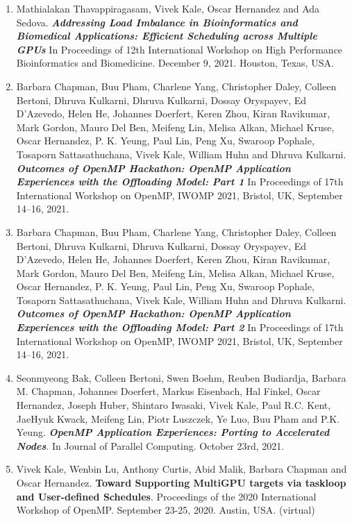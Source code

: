 \begin{enumerate}
\item Mathialakan Thavappiragasam, Vivek Kale, Oscar Hernandez and  Ada Sedova. \textbf{\textit{Addressing Load Imbalance in Bioinformatics and Biomedical Applications: Efficient Scheduling across Multiple GPUs}} In Proceedings of 12th International Workshop on High Performance Bioinformatics and Biomedicine. December 9, 2021. Houston, Texas, USA. 

\item Barbara Chapman, Buu Pham, Charlene Yang, Christopher Daley, Colleen Bertoni, Dhruva Kulkarni, Dhruva Kulkarni, Dossay Oryspayev, Ed D’Azevedo, Helen He, Johannes Doerfert, Keren Zhou, Kiran Ravikumar, Mark Gordon, Mauro Del Ben, Meifeng Lin, Melisa Alkan, Michael Kruse, Oscar Hernandez, P. K. Yeung, Paul Lin, Peng Xu, Swaroop Pophale, Tosaporn Sattasathuchana, Vivek Kale, William Huhn and Dhruva Kulkarni. \textbf{\textit{Outcomes of OpenMP Hackathon: OpenMP Application Experiences with the Offloading Model: Part 1}} In Proceedings of 17th International Workshop on OpenMP, IWOMP 2021, Bristol, UK, September 14–16, 2021. 

\item Barbara Chapman, Buu Pham, Charlene Yang, Christopher Daley, Colleen Bertoni, Dhruva Kulkarni, Dhruva Kulkarni, Dossay Oryspayev, Ed D’Azevedo, Helen He, Johannes Doerfert, Keren Zhou, Kiran Ravikumar, Mark Gordon, Mauro Del Ben, Meifeng Lin, Melisa Alkan, Michael Kruse, Oscar Hernandez, P. K. Yeung, Paul Lin, Peng Xu, Swaroop Pophale, Tosaporn Sattasathuchana, Vivek Kale, William Huhn and Dhruva Kulkarni. \textbf{\textit{Outcomes of OpenMP Hackathon: OpenMP Application Experiences with the Offloading Model: Part 2}} In Proceedings of 17th International Workshop on OpenMP, IWOMP 2021, Bristol, UK, September 14–16, 2021. 

\item Seonmyeong Bak, Colleen Bertoni, Swen Boehm, Reuben Budiardja, Barbara M. Chapman, Johannes Doerfert, Markus Eisenbach, Hal Finkel, Oscar Hernandez, Joseph Huber, Shintaro Iwasaki, Vivek Kale, Paul R.C. Kent, JaeHyuk Kwack, Meifeng Lin, Piotr Luszczek, Ye Luo, Buu Pham and P.K. Yeung. \textbf{\textit{OpenMP Application Experiences: Porting to Accelerated Nodes}}.  In Journal of Parallel Computing. October 23rd, 2021.

\item Vivek Kale, Wenbin Lu, Anthony Curtis, Abid Malik, Barbara Chapman and Oscar Hernandez. \textbf{\textbf{Toward Supporting MultiGPU targets via taskloop and User-defined Schedules}}. Proceedings of the 2020 International Workshop of OpenMP. September 23-25, 2020. Austin, USA. (virtual) 


\end{enumerate}
